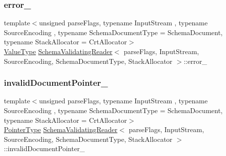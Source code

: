 \subsubsection{\texorpdfstring{error\+\_\+}{error\_}}
{\footnotesize\ttfamily template$<$unsigned parse\+Flags, typename Input\+Stream , typename Source\+Encoding , typename Schema\+Document\+Type  = Schema\+Document, typename Stack\+Allocator  = Crt\+Allocator$>$ \\
\hyperlink{classSchemaValidatingReader_af08b51fcef602c68d95769c35ae606be}{Value\+Type} \hyperlink{classSchemaValidatingReader}{Schema\+Validating\+Reader}$<$ parse\+Flags, Input\+Stream, Source\+Encoding, Schema\+Document\+Type, Stack\+Allocator $>$\+::error\+\_\+\hspace{0.3cm}{\ttfamily [private]}}

\mbox{\label{classSchemaValidatingReader_ad4a32d0f16f800399813a1caab6e2453}} 
\subsubsection{\texorpdfstring{invalid\+Document\+Pointer\+\_\+}{invalidDocumentPointer\_}}
{\footnotesize\ttfamily template$<$unsigned parse\+Flags, typename Input\+Stream , typename Source\+Encoding , typename Schema\+Document\+Type  = Schema\+Document, typename Stack\+Allocator  = Crt\+Allocator$>$ \\
\hyperlink{classSchemaValidatingReader_a30ecf1b20ca5a1b79e0d5f4ceb3bf198}{Pointer\+Type} \hyperlink{classSchemaValidatingReader}{Schema\+Validating\+Reader}$<$ parse\+Flags, Input\+Stream, Source\+Encoding, Schema\+Document\+Type, Stack\+Allocator $>$\+::invalid\+Document\+Pointer\+\_\+\hspace{0.3cm}{\ttfamily [private]}}

\mbox{\label{classSchemaValidatingReader_a33ec294ce0352abc0ac24b2e69c10b70}} 
